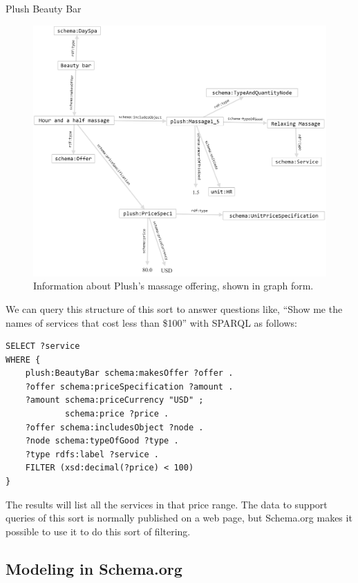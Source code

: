 \begin{example}{Plush Beauty Bar}
\begin{figure}
\centering
\includegraphics[width=5in]{SWWOv3/figure10-plushdata.png}
\caption{Information about Plush's massage offering, shown in graph form.}
\label{fig:ch10.02}
\end{figure}



We can query this structure of this sort to answer questions like,
``Show me the names of services that
cost less than \$100'' with SPARQL as follows:

\begin{lstlisting}
SELECT ?service 
WHERE {
    plush:BeautyBar schema:makesOffer ?offer . 
    ?offer schema:priceSpecification ?amount .
    ?amount schema:priceCurrency "USD" ;
            schema:price ?price .
    ?offer schema:includesObject ?node .
    ?node schema:typeOfGood ?type .
    ?type rdfs:label ?service .
    FILTER (xsd:decimal(?price) < 100)
}
\end{lstlisting}


The results will list all the services in that price range.  The data to 
support queries of this sort is normally published on a web page, 
but Schema.org makes it possible to use it to do this sort of filtering. 
\end{example}





\subsection{Modeling in Schema.org}


